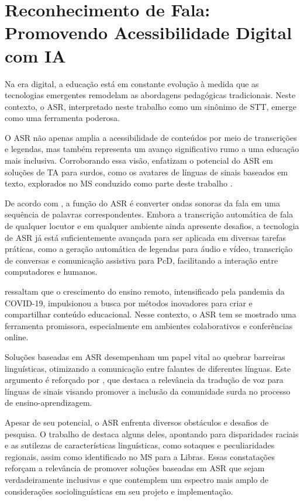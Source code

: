 \section{Reconhecimento de Fala: Promovendo Acessibilidade Digital com IA}
\label{section:foundation:asr}

Na era digital, a educação está em constante evolução à medida que as tecnologias emergentes remodelam as abordagens pedagógicas tradicionais. Neste contexto, o ASR, interpretado neste trabalho como um sinônimo de STT, emerge como uma ferramenta poderosa.

O ASR não apenas amplia a acessibilidade de conteúdos por meio de transcrições e legendas, mas também representa um avanço significativo rumo a uma educação mais inclusiva. Corroborando essa visão,  enfatizam o potencial do ASR em soluções de TA para surdos, como os avatares de línguas de sinais baseados em texto, explorados no MS conduzido como parte deste trabalho \cite{FalvoJr2021_RENOTE}.

De acordo com , a função do ASR é converter ondas sonoras da fala em uma sequência de palavras correspondentes. Embora a transcrição automática de fala de qualquer locutor e em qualquer ambiente ainda apresente desafios, a tecnologia de ASR já está suficientemente avançada para ser aplicada em diversas tarefas práticas, como a geração automática de legendas para áudio e vídeo, transcrição de conversas e comunicação assistiva para PcD, facilitando a interação entre computadores e humanos.

 ressaltam que o crescimento do ensino remoto, intensificado pela pandemia da COVID-19, impulsionou a busca por métodos inovadores para criar e compartilhar conteúdo educacional. Nesse contexto, o ASR tem se mostrado uma ferramenta promissora, especialmente em ambientes colaborativos e conferências online.

Soluções baseadas em ASR desempenham um papel vital ao quebrar barreiras linguísticas, otimizando a comunicação entre falantes de diferentes línguas. Este argumento é reforçado por , que destaca a relevância da tradução de voz para línguas de sinais visando promover a inclusão da comunidade surda no processo de ensino-aprendizagem.

Apesar de seu potencial, o ASR enfrenta diversos obstáculos e desafios de pesquisa. O trabalho de  destaca alguns deles, apontando para disparidades raciais e as sutilezas de características linguísticas, como sotaques e peculiaridades regionais, assim como identificado no MS para a Libras. Essas constatações reforçam a relevância de promover soluções baseadas em ASR que sejam verdadeiramente inclusivas e que contemplem um espectro mais amplo de considerações sociolinguísticas em seu projeto e implementação.

